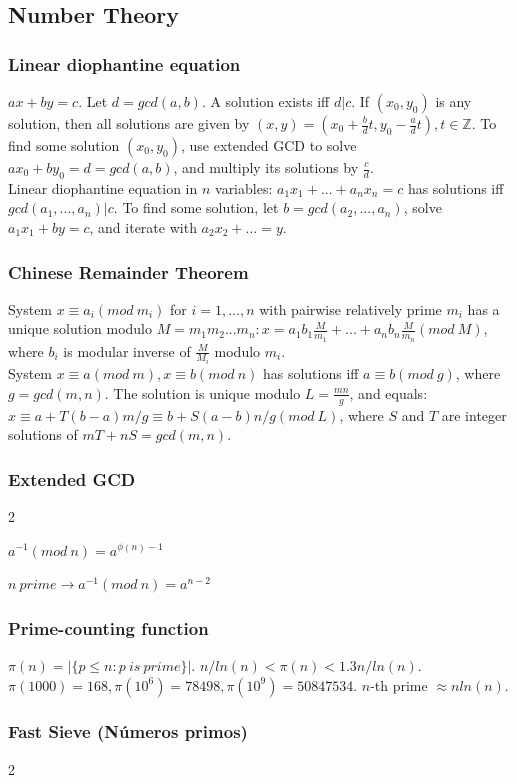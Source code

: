 \documentclass[a4paper,12pt]{article}
\newcommand\includefile[4]{
  \subsubsection{#2}
  \begin{multicols}{2}
    
  \end{multicols}
}
\begin{document}
\subsection{Number Theory}
\subsubsection{Linear diophantine equation}
$ax + by = c$. Let $d = gcd(a,b)$. A solution exists iff $d|c$. If $(x_0, y_0)$ is any solution, then all solutions are given by $(x, y) = (x_0 + \frac{b}{d}t, y_0 - \frac{a}{d}t), t \in \mathbb{Z}$. To find some solution $(x_0, y_0)$,
use extended GCD to solve $ax_0 + by_0 = d = gcd(a, b)$, and multiply its solutions by $\frac{c}{d}$.\\
Linear diophantine equation in $n$ variables: $a_1x_1 + ... + a_nx_n = c$ has solutions iff $gcd(a_1, ..., a_n) | c$. To find some solution, let $b = gcd(a_2, ..., a_n)$, solve $a_1x_1 + by = c$, and iterate with $a_2x_2 + ... = y$.

\subsubsection{Chinese Remainder Theorem}
System $x \equiv a_i (mod\ m_i)$ for $i = 1, ..., n$ with pairwise relatively prime $m_i$ has a unique solution modulo $M = m_1m_2...m_n : x = a_1b_1\frac{M}{m_1} + ... + a_nb_n\frac{M}{m_n} (mod\ M)$, where $b_i$ is modular inverse of $\frac{M}{M_i}$ modulo $m_i$.\\
System $x \equiv a (mod\ m), x \equiv b (mod\ n)$ has solutions iff $a \equiv b (mod\ g)$, where $g = gcd(m,n)$. The solution is unique modulo $L = \frac{mn}{g}$, and equals: $x \equiv a + T(b-a)m/g \equiv b + S(a-b)n/g (mod\ L)$, where $S$ and $T$ are integer solutions of $mT + nS = gcd(m,n)$.

\newpage
\includefile{c++}{Extended GCD}{meh}{gcdext.cpp}

$a^{-1} (mod\ n) = a^{\phi(n)-1}$

$n\ prime \rightarrow a^{-1} (mod\ n) = a^{n-2}$

\subsubsection{Prime-counting function}
$\pi(n) = |\{p \leq n : p\ is\ prime\}|$. $n / ln(n) < \pi(n) < 1.3n / ln(n)$. $\pi(1000) = 168, \pi(10^6) = 78498, \pi(10^9) = 50 847 534$. $n$-th prime $\approx n ln(n)$.

\newpage
\includefile{c++}{Fast Sieve (Números primos)}{math}{sieve.cpp}
\end{document}
